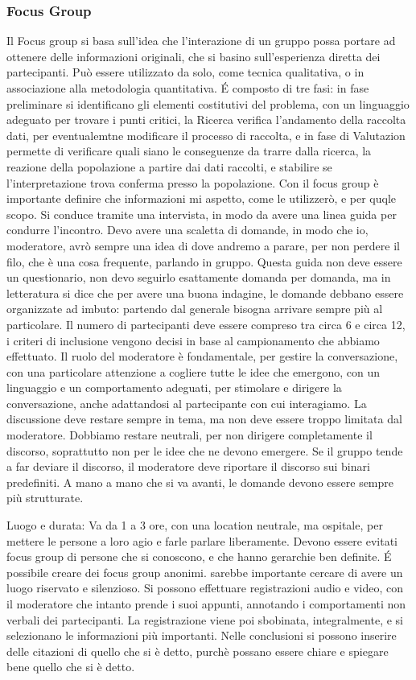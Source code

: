 \subsubsection{Focus Group}
Il Focus group si basa sull'idea che l'interazione di un gruppo possa portare ad ottenere delle informazioni originali, che si basino sull'esperienza diretta dei partecipanti. Può essere utilizzato da solo, come tecnica qualitativa, o in associazione alla metodologia quantitativa.
\'E composto di tre fasi: in fase preliminare si identificano gli elementi costitutivi del problema, con un linguaggio adeguato per trovare i punti critici, la Ricerca verifica l'andamento della raccolta dati, per eventualemtne modificare il processo di raccolta, e in fase di Valutazion permette di verificare quali siano le conseguenze da trarre dalla ricerca, la reazione della popolazione a partire dai dati raccolti, e stabilire se l'interpretazione trova conferma presso la popolazione.
Con il focus group è importante definire che informazioni mi aspetto, come le utilizzerò, e per quqle scopo. Si conduce tramite una intervista, in modo da avere una linea guida per condurre l'incontro. Devo avere una scaletta di domande, in modo che io, moderatore, avrò sempre una idea di dove andremo a parare, per non perdere il filo, che è una cosa frequente, parlando in gruppo.
Questa guida non deve essere un questionario, non devo seguirlo esattamente domanda per domanda, ma in letteratura si dice che per avere una buona indagine, le domande debbano essere organizzate ad imbuto: partendo dal generale bisogna arrivare sempre più al particolare.
Il numero di partecipanti deve essere compreso tra circa 6 e circa 12, i criteri di inclusione vengono decisi in base al campionamento che abbiamo effettuato. Il ruolo del moderatore è fondamentale, per gestire la conversazione, con una particolare attenzione a cogliere tutte le idee che emergono, con un linguaggio e un comportamento adeguati, per stimolare e dirigere la conversazione, anche adattandosi al partecipante con cui interagiamo. La discussione deve restare sempre in tema, ma non deve essere troppo limitata dal moderatore. Dobbiamo restare neutrali, per non dirigere completamente il discorso, soprattutto non per le idee che ne devono emergere. Se il gruppo tende a far deviare il discorso, il moderatore deve riportare il discorso sui binari predefiniti. A mano a mano che si va avanti, le domande devono essere sempre più strutturate.

Luogo e durata: Va da 1 a 3 ore, con una location neutrale, ma ospitale, per mettere le persone a loro agio e farle parlare liberamente. Devono essere evitati focus group di persone che si conoscono, e che hanno gerarchie ben definite. \'E possibile creare dei focus group anonimi. sarebbe importante cercare di avere un luogo riservato e silenzioso. Si possono effettuare registrazioni audio e video, con il moderatore che intanto prende i suoi appunti, annotando i comportamenti non verbali dei partecipanti. La registrazione viene poi sbobinata, integralmente, e si selezionano le informazioni più importanti. Nelle conclusioni si possono inserire delle citazioni di quello che si è detto, purchè possano essere chiare e spiegare bene quello che si è detto.

